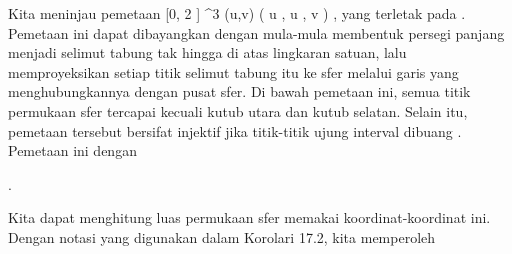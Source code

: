 {

Kita meninjau pemetaan
\maabbeledisp {\varphi} { [0, 2 \pi] \times \R} {\R^3
} {(u,v)} { {  }  ( \cos  u  , \sin  u  , v )
} {,}
yang
terletak pada  {.} Pemetaan ini dapat dibayangkan dengan mula-mula membentuk persegi panjang
 {} {}
\mathl{[0, 2 \pi] \times \R}{} menjadi selimut tabung tak hingga di atas lingkaran satuan, lalu memproyeksikan setiap titik selimut tabung itu ke sfer melalui garis yang menghubungkannya dengan pusat sfer. Di bawah pemetaan ini, semua titik permukaan sfer tercapai kecuali kutub utara dan kutub selatan. Selain itu, pemetaan tersebut bersifat injektif jika titik-titik ujung interval dibuang
 {} {.}
Pemetaan ini
dengan

 { . }

Kita dapat menghitung luas permukaan sfer memakai koordinat-koordinat ini. Dengan notasi yang digunakan dalam
Korolari 17.2,
kita memperoleh

}
